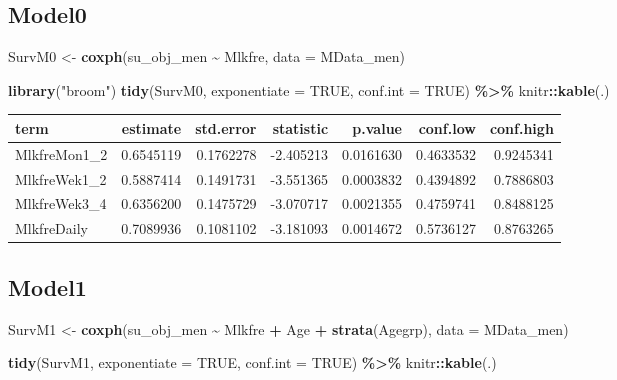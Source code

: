 \documentclass[
]{article}
\newenvironment{Shaded}{\begin{snugshade}}{\end{snugshade}}
\newcommand{\DataTypeTok}[1]{\textcolor[rgb]{0.13,0.29,0.53}{#1}}
\newcommand{\KeywordTok}[1]{\textcolor[rgb]{0.13,0.29,0.53}{\textbf{#1}}}
\newcommand{\NormalTok}[1]{#1}
\newcommand{\OperatorTok}[1]{\textcolor[rgb]{0.81,0.36,0.00}{\textbf{#1}}}
\newcommand{\OtherTok}[1]{\textcolor[rgb]{0.56,0.35,0.01}{#1}}
\newcommand{\StringTok}[1]{\textcolor[rgb]{0.31,0.60,0.02}{#1}}
\begin{document}
\hypertarget{model0-5}{%
\subsection{Model0}\label{model0-5}}

\begin{Shaded}
\begin{Highlighting}[]
\NormalTok{SurvM0 \textless{}{-}}\StringTok{  }\KeywordTok{coxph}\NormalTok{(su\_obj\_men }\OperatorTok{\textasciitilde{}}\StringTok{ }\NormalTok{Mlkfre, }
                 \DataTypeTok{data =}\NormalTok{ MData\_men)}

\KeywordTok{library}\NormalTok{(}\StringTok{"broom"}\NormalTok{)}
\KeywordTok{tidy}\NormalTok{(SurvM0, }\DataTypeTok{exponentiate =} \OtherTok{TRUE}\NormalTok{, }\DataTypeTok{conf.int =} \OtherTok{TRUE}\NormalTok{) }\OperatorTok{\%\textgreater{}\%}\StringTok{ }
\StringTok{  }\NormalTok{knitr}\OperatorTok{::}\KeywordTok{kable}\NormalTok{(.)}
\end{Highlighting}
\end{Shaded}

\begin{longtable}[]{@{}lrrrrrr@{}}
\toprule
term & estimate & std.error & statistic & p.value & conf.low &
conf.high\tabularnewline
\midrule
\endhead
MlkfreMon1\_2 & 0.6545119 & 0.1762278 & -2.405213 & 0.0161630 &
0.4633532 & 0.9245341\tabularnewline
MlkfreWek1\_2 & 0.5887414 & 0.1491731 & -3.551365 & 0.0003832 &
0.4394892 & 0.7886803\tabularnewline
MlkfreWek3\_4 & 0.6356200 & 0.1475729 & -3.070717 & 0.0021355 &
0.4759741 & 0.8488125\tabularnewline
MlkfreDaily & 0.7089936 & 0.1081102 & -3.181093 & 0.0014672 & 0.5736127
& 0.8763265\tabularnewline
\bottomrule
\end{longtable}

\hypertarget{model1-5}{%
\subsection{Model1}\label{model1-5}}

\begin{Shaded}
\begin{Highlighting}[]
\NormalTok{SurvM1 \textless{}{-}}\StringTok{  }\KeywordTok{coxph}\NormalTok{(su\_obj\_men }\OperatorTok{\textasciitilde{}}\StringTok{ }\NormalTok{Mlkfre }\OperatorTok{+}\StringTok{ }\NormalTok{Age }\OperatorTok{+}\StringTok{ }\KeywordTok{strata}\NormalTok{(Agegrp), }
                 \DataTypeTok{data =}\NormalTok{ MData\_men)}

\KeywordTok{tidy}\NormalTok{(SurvM1, }\DataTypeTok{exponentiate =} \OtherTok{TRUE}\NormalTok{, }\DataTypeTok{conf.int =} \OtherTok{TRUE}\NormalTok{) }\OperatorTok{\%\textgreater{}\%}\StringTok{ }
\StringTok{  }\NormalTok{knitr}\OperatorTok{::}\KeywordTok{kable}\NormalTok{(.)}
\end{Highlighting}
\end{Shaded}
\end{document}
